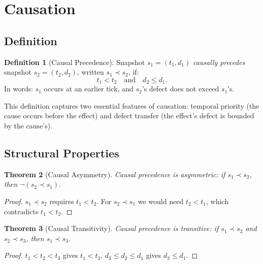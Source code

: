 \documentclass[12pt,a4paper]{article}
\newtheorem{theorem}{Theorem}[section]
\theoremstyle{definition}
\newtheorem{definition}[theorem]{Definition}
\theoremstyle{remark}
\begin{document}
\section{Causation}
\label{sec:causation}

\subsection{Definition}

\begin{definition}[Causal Precedence]
\label{def:cause}
Snapshot $s_1 = (t_1, d_1)$ \emph{causally precedes} snapshot
$s_2 = (t_2, d_2)$, written $s_1 \prec s_2$, if:
\begin{equation}
  t_1 < t_2 \quad\text{and}\quad d_2 \leq d_1.
\end{equation}
In words: $s_1$ occurs at an earlier tick, and $s_2$'s defect does not
exceed $s_1$'s.
\end{definition}

This definition captures two essential features of causation: temporal
priority (the cause occurs before the effect) and defect transfer (the
effect's defect is bounded by the cause's).

\subsection{Structural Properties}

\begin{theorem}[Causal Asymmetry]
\label{thm:asymmetry}
Causal precedence is asymmetric: if $s_1 \prec s_2$, then
$\neg(s_2 \prec s_1)$.
\end{theorem}

\begin{proof}
$s_1 \prec s_2$ requires $t_1 < t_2$.  For $s_2 \prec s_1$ we would
need $t_2 < t_1$, which contradicts $t_1 < t_2$.
\end{proof}

\begin{theorem}[Causal Transitivity]
\label{thm:transitivity}
Causal precedence is transitive: if $s_1 \prec s_2$ and
$s_2 \prec s_3$, then $s_1 \prec s_3$.
\end{theorem}

\begin{proof}
$t_1 < t_2 < t_3$ gives $t_1 < t_3$.  $d_3 \leq d_2 \leq d_1$ gives
$d_3 \leq d_1$.
\end{proof}
\end{document}
